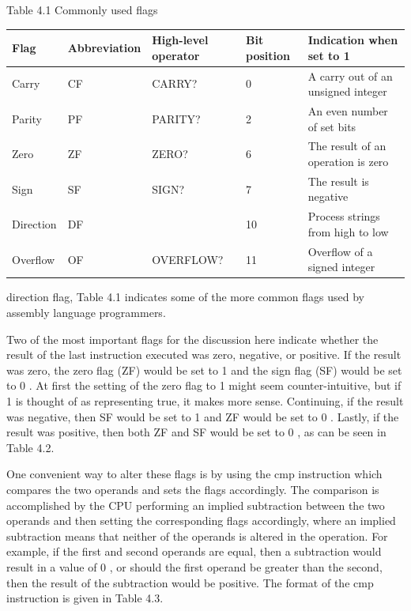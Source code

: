 \documentclass[10pt]{article}
\begin{document}
Table 4.1 Commonly used flags

\begin{center}
\begin{tabular}{|l|l|l|l|l|}
\hline
Flag & Abbreviation & High-level operator & Bit position & Indication when set to 1 \\
\hline
Carry & CF & CARRY? & 0 & A carry out of an unsigned integer \\
\hline
Parity & PF & PARITY? & 2 & An even number of set bits \\
\hline
Zero & ZF & ZERO? & 6 & The result of an operation is zero \\
\hline
Sign & SF & SIGN? & 7 & The result is negative \\
\hline
Direction & DF &  & 10 & Process strings from high to low \\
\hline
Overflow & OF & OVERFLOW? & 11 & Overflow of a signed integer \\
\hline
\end{tabular}
\end{center}

direction flag, Table 4.1 indicates some of the more common flags used by assembly language programmers.

Two of the most important flags for the discussion here indicate whether the result of the last instruction executed was zero, negative, or positive. If the result was zero, the zero flag (ZF) would be set to 1 and the sign flag (SF) would be set to 0 . At first the setting of the zero flag to 1 might seem counter-intuitive, but if 1 is thought of as representing true, it makes more sense. Continuing, if the result was negative, then SF would be set to 1 and ZF would be set to 0 . Lastly, if the result was positive, then both ZF and SF would be set to 0 , as can be seen in Table 4.2.

One convenient way to alter these flags is by using the cmp instruction which compares the two operands and sets the flags accordingly. The comparison is accomplished by the CPU performing an implied subtraction between the two operands and then setting the corresponding flags accordingly, where an implied subtraction means that neither of the operands is altered in the operation. For example, if the first and second operands are equal, then a subtraction would result in a value of 0 , or should the first operand be greater than the second, then the result of the subtraction would be positive. The format of the cmp instruction is given in Table 4.3.
\end{document}

